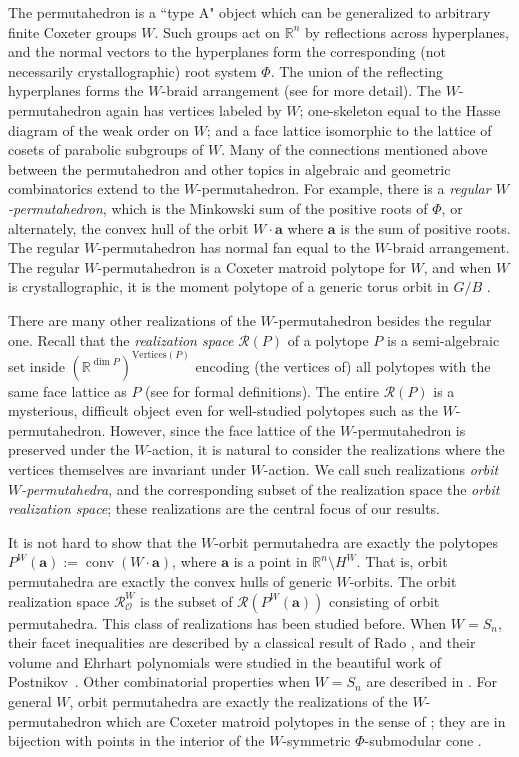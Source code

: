 \documentclass{amsart}
\theoremstyle{definition}
\newcommand{\rspace}[1]{\mathcal{R}(#1)}
\newcommand{\ospace}{\mathcal{R}_{\mathcal{O}}}
\newcommand{\bR}{\mathbb{R}}
\def\ba{\mathbf{a}}
\def\wperm_#1{P^W(#1)}
\DeclareMathOperator{\conv}{conv}
\begin{document}
The permutahedron is a ``type A" object which can be generalized to arbitrary finite Coxeter groups $W$. Such groups act on $\mathbb{R}^n$ by reflections across hyperplanes, and the normal vectors to the hyperplanes form the corresponding (not necessarily crystallographic) root system $\Phi$. The union of the reflecting hyperplanes forms the $W$-braid arrangement (see \cite{BjornerBrenti05,Humphreys90} for more detail). The $W$-permutahedron again has vertices labeled by $W$; one-skeleton equal to the Hasse diagram of the weak order on $W$; and a face lattice isomorphic to the lattice of cosets of parabolic subgroups of $W$. Many of the connections mentioned above between the permutahedron and other topics in algebraic and geometric combinatorics extend to the $W$-permutahedron. For example, there is a \emph{regular $W$-permutahedron}, which is the Minkowski sum of the positive roots of $\Phi$, or alternately, the convex hull of the orbit $W \cdot \ba$ where $\ba$ is the sum of positive roots. The regular $W$-permutahedron has normal fan equal to the $W$-braid arrangement. The regular $W$-permutahedron is a Coxeter matroid polytope for $W$, and when $W$ is crystallographic, it is the moment polytope of a generic torus orbit in $G/B$ \cite{BGW}.

There are many other realizations of the $W$-permutahedron besides the regular one. Recall that the \emph{realization space} $\mathcal{R}(P)$ of a polytope $P$ is a semi-algebraic set inside $(\bR^{\dim P})^{\text{Vertices}(P)}$ encoding (the vertices of) all polytopes with the same face lattice as $P$ (see \cite{Bjorneretal1999, RichterGebert96} for formal definitions). The entire $\mathcal{R}(P)$ is a mysterious, difficult object even for well-studied polytopes such as the $W$-permutahedron. However, since the face lattice of the $W$-permutahedron is preserved under the $W$-action, it is natural to consider the realizations where the vertices themselves are invariant under $W$-action. We call such realizations \emph{orbit $W$-permutahedra}, and the corresponding subset of the realization space the \emph{orbit realization space}; these realizations are the central focus of our results.



It is not hard to show that the $W$-orbit permutahedra are exactly the polytopes $\wperm_{\ba}:=\conv(W \cdot \ba)$, where $\ba$ is a point in $\mathbb{R}^n \setminus H^W$. That is, orbit permutahedra are exactly the convex hulls of generic $W$-orbits. The orbit realization space $\ospace^W$ is the subset of $\rspace{\wperm_\ba}$ consisting of orbit permutahedra. This class of realizations has been studied before. When $W=S_n$, their facet inequalities are described by a classical result of Rado \cite{Rado52}, and their volume and Ehrhart polynomials were studied in the beautiful work of Postnikov~\cite{Post09}. Other combinatorial properties when $W=S_n$ are described in \cite{HolwegLangeThomas2011,Pons2023}. For general $W$, orbit permutahedra are exactly the realizations of the $W$-permutahedron which are Coxeter matroid polytopes in the sense of \cite{BGW}; they are in bijection with points in the interior of the $W$-symmetric $\Phi$-submodular cone \cite{ACEP}.
 
\end{document}
